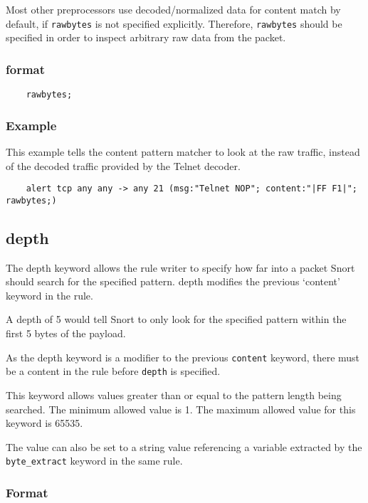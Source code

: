 \documentclass[english]{report}
\begin{document}
Most other preprocessors use decoded/normalized data for content match by default, if
\texttt{rawbytes} is not specified explicitly.  Therefore, \texttt{rawbytes} should
be specified in order to inspect arbitrary raw data from the packet.

\subsubsection{format}

\begin{verbatim}
    rawbytes;
\end{verbatim}

\subsubsection{Example}

This example tells the content pattern matcher to look at the raw traffic,
instead of the decoded traffic provided by the Telnet decoder.

\begin{verbatim}
    alert tcp any any -> any 21 (msg:"Telnet NOP"; content:"|FF F1|"; rawbytes;)
\end{verbatim}

\subsection{depth}
\label{sub:depth}

The depth keyword allows the rule writer to specify how far into a packet Snort
should search for the specified pattern.  depth modifies the previous `content'
keyword in the rule.

A depth of 5 would tell Snort to only look for the specified pattern within the
first 5 bytes of the payload.

As the depth keyword is a modifier to the previous \texttt{content} keyword, there
must be a content in the rule before \texttt{depth} is specified.

This keyword allows values greater than or equal to the pattern length being
searched. The minimum allowed value is 1.  The maximum allowed value for this
keyword is 65535.

The value can also be set to a string value referencing a variable extracted by the
\texttt{byte\_extract} keyword in the same rule.

\subsubsection{Format}
\end{document}
